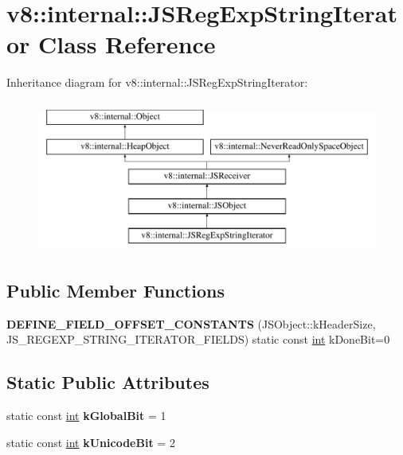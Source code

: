 \hypertarget{classv8_1_1internal_1_1JSRegExpStringIterator}{}\section{v8\+:\+:internal\+:\+:J\+S\+Reg\+Exp\+String\+Iterator Class Reference}
\label{classv8_1_1internal_1_1JSRegExpStringIterator}
Inheritance diagram for v8\+:\+:internal\+:\+:J\+S\+Reg\+Exp\+String\+Iterator\+:\begin{figure}[H]
\begin{center}
\leavevmode
\includegraphics[height=5.000000cm]{classv8_1_1internal_1_1JSRegExpStringIterator}
\end{center}
\end{figure}
\subsection*{Public Member Functions}
\begin{DoxyCompactItemize}
\item 
\mbox{\label{classv8_1_1internal_1_1JSRegExpStringIterator_aac0e3f343211a36c60a54a15a8e1dfbc}} 
{\bfseries D\+E\+F\+I\+N\+E\+\_\+\+F\+I\+E\+L\+D\+\_\+\+O\+F\+F\+S\+E\+T\+\_\+\+C\+O\+N\+S\+T\+A\+N\+TS} (J\+S\+Object\+::k\+Header\+Size, J\+S\+\_\+\+R\+E\+G\+E\+X\+P\+\_\+\+S\+T\+R\+I\+N\+G\+\_\+\+I\+T\+E\+R\+A\+T\+O\+R\+\_\+\+F\+I\+E\+L\+DS) static const \mbox{\hyperlink{classint}{int}} k\+Done\+Bit=0
\end{DoxyCompactItemize}
\subsection*{Static Public Attributes}
\begin{DoxyCompactItemize}
\item 
\mbox{\label{classv8_1_1internal_1_1JSRegExpStringIterator_a83f839799b55f20f00f34fccbcb4b44c}} 
static const \mbox{\hyperlink{classint}{int}} {\bfseries k\+Global\+Bit} = 1
\item 
\mbox{\label{classv8_1_1internal_1_1JSRegExpStringIterator_af79dd7fa03892780e3027656bfff3bc8}} 
static const \mbox{\hyperlink{classint}{int}} {\bfseries k\+Unicode\+Bit} = 2
\end{DoxyCompactItemize}
